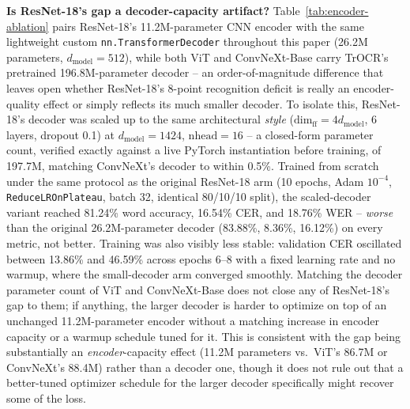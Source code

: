 \documentclass[a4paper,fleqn]{cas-dc}
\begin{document}
\textbf{Is ResNet-18's gap a decoder-capacity artifact?} Table~\ref{tab:encoder-ablation}
pairs ResNet-18's 11.2M-parameter CNN encoder with the same lightweight
custom \texttt{nn.TransformerDecoder} throughout this paper (26.2M
parameters, $d_{\text{model}}{=}512$), while both ViT and ConvNeXt-Base
carry TrOCR's pretrained 196.8M-parameter decoder -- an order-of-magnitude
difference that leaves open whether ResNet-18's 8-point recognition
deficit is really an encoder-quality effect or simply reflects its
much smaller decoder. To isolate this, ResNet-18's decoder was scaled up
to the same architectural \emph{style} ($\mathrm{dim}_{\text{ff}}{=}4
d_{\text{model}}$, 6 layers, dropout 0.1) at $d_{\text{model}}{=}1424$,
$\mathrm{nhead}{=}16$ -- a closed-form parameter count, verified exactly
against a live PyTorch instantiation before training, of 197.7M, matching
ConvNeXt's decoder to within 0.5\%. Trained from scratch under the same
protocol as the original ResNet-18 arm (10 epochs, Adam $10^{-4}$,
\texttt{ReduceLROnPlateau}, batch 32, identical 80/10/10 split), the
scaled-decoder variant reached 81.24\% word accuracy, 16.54\% CER, and
18.76\% WER -- \emph{worse} than the original 26.2M-parameter decoder
(83.88\%, 8.36\%, 16.12\%) on every metric, not better. Training was also
visibly less stable: validation CER oscillated between 13.86\% and
46.59\% across epochs 6--8 with a fixed learning rate and no warmup,
where the small-decoder arm converged smoothly. Matching the decoder
parameter count of ViT and ConvNeXt-Base does not close any of ResNet-18's
gap to them; if anything, the larger decoder is harder to optimize on top
of an unchanged 11.2M-parameter encoder without a matching increase in
encoder capacity or a warmup schedule tuned for it. This is consistent
with the gap being substantially an \emph{encoder}-capacity effect (11.2M
parameters vs.\ ViT's 86.7M or ConvNeXt's 88.4M) rather than a decoder
one, though it does not rule out that a better-tuned optimizer schedule
for the larger decoder specifically might recover some of the loss.
\end{document}
